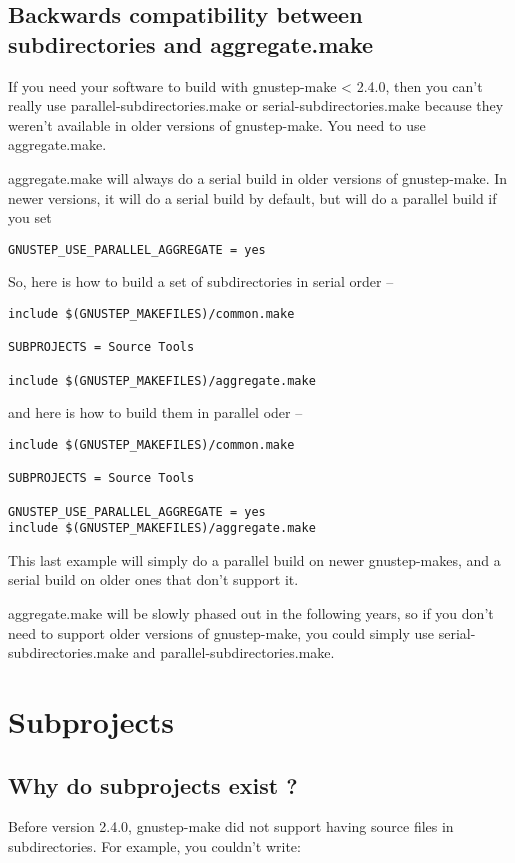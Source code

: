 \documentclass[a4paper]{article}
\begin{document}
\subsection{Backwards compatibility between subdirectories and aggregate.make}
If you need your software to build with gnustep-make < 2.4.0, then you
can't really use parallel-subdirectories.make or
serial-subdirectories.make because they weren't available in older
versions of gnustep-make.  You need to use aggregate.make.

aggregate.make will always do a serial build in older versions of
gnustep-make.  In newer versions, it will do a serial build by
default, but will do a parallel build if you set 

\begin{verbatim}
GNUSTEP_USE_PARALLEL_AGGREGATE = yes
\end{verbatim}

So, here is how to build a set of subdirectories in serial order --

\begin{verbatim}
include $(GNUSTEP_MAKEFILES)/common.make

SUBPROJECTS = Source Tools

include $(GNUSTEP_MAKEFILES)/aggregate.make
\end{verbatim}

and here is how to build them in parallel oder --

\begin{verbatim}
include $(GNUSTEP_MAKEFILES)/common.make

SUBPROJECTS = Source Tools

GNUSTEP_USE_PARALLEL_AGGREGATE = yes
include $(GNUSTEP_MAKEFILES)/aggregate.make
\end{verbatim}

This last example will simply do a parallel build on newer
gnustep-makes, and a serial build on older ones that don't support it.

aggregate.make will be slowly phased out in the following years, so if
you don't need to support older versions of gnustep-make, you could
simply use serial-subdirectories.make and
parallel-subdirectories.make.

\section{Subprojects}
\subsection{Why do subprojects exist ?}
Before version 2.4.0, gnustep-make did not support having source files
in subdirectories.  For example, you couldn't write:
\end{document}
